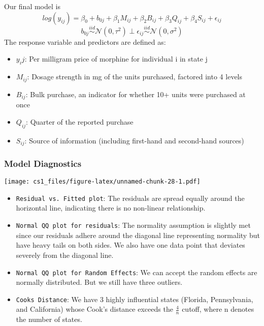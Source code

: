 \documentclass[
  11pt,
]{article}
\providecommand{\tightlist}{%
  \setlength{\itemsep}{0pt}\setlength{\parskip}{0pt}}
\begin{document}
Our final model is
\[log(y_{ij}) = \beta_0 + b_{0j} + \beta_1 M_{ij} + \beta_2 B_{ij} + \beta_3 Q_{ij} + \beta_4 S_{ij} + \epsilon_{ij}\]
\[b_{0j} \stackrel{iid}\sim \mathcal{N}(0, \tau^2) \perp \epsilon_{ij} \stackrel{iid} \sim \mathcal{N}(0, \sigma^2)\]
The response variable and predictors are defined as:

\begin{itemize}
\item
  \(y_ij\): Per milligram price of morphine for individual i in state j
\item
  \(M_{ij}\): Dosage strength in mg of the units purchased, factored
  into 4 levels
\item
  \(B_{ij}\): Bulk purchase, an indicator for whether 10+ units were
  purchased at once
\item
  \(Q_{ij}\): Quarter of the reported purchase
\item
  \(S_{ij}\): Source of information (including first-hand and
  second-hand sources)
\end{itemize}

\hypertarget{model-diagnostics}{%
\subsubsection{Model Diagnostics}\label{model-diagnostics}}

\texttt{[image: cs1\_files/figure-latex/unnamed-chunk-28-1.pdf]}

\begin{itemize}
\tightlist
\item
  \texttt{Residual\ vs.\ Fitted\ plot}: The residuals are spread equally
  around the horizontal line, indicating there is no non-linear
  relationship.
\item
  \texttt{Normal\ QQ\ plot\ for\ residuals}: The normality assumption is
  slightly met since our residuals adhere around the diagonal line
  representing normality but have heavy tails on both sides. We also
  have one data point that deviates severely from the diagonal line.
\item
  \texttt{Normal\ QQ\ plot\ for\ Random\ Effects}: We can accept the
  random effects are normally distributed. But we still have three
  outliers.
\item
  \texttt{Cook\textquotesingle{}s\ Distance}: We have 3 highly
  influential states (Florida, Pennsylvania, and California) whose
  Cook's distance exceeds the \(\frac{4}{n}\) cutoff, where n denotes
  the number of states.
\end{itemize}
\end{document}
